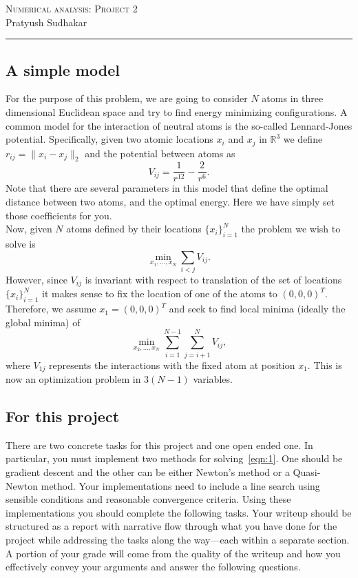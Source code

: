 \documentclass[11pt,onecolumn]{article}
\begin{document}
\noindent
\textsc{\Large Numerical analysis: Project 2}\\
Pratyush Sudhakar
\vspace{0.4cm}
\hrule
\noindent

\subsection*{A simple model}

For the purpose of this problem, we are going to consider $N$ atoms in three dimensional Euclidean space and try to find energy minimizing configurations. A common model for the interaction of neutral atoms is the so-called Lennard-Jones potential. Specifically, given two atomic locations $x_i$ and $x_j$ in $\mathbb{R}^3$ we define $r_{ij} = \|x_i-x_j\|_2$ and the potential between atoms as 
\[
V_{ij} = \frac{1}{r^{12}} - \frac{2}{r^6}.
\]
Note that there are several parameters in this model that define the optimal distance between two atoms, and the optimal energy. Here we have simply set those coefficients for you.
\\
Now, given $N$ atoms defined by their locations $\{x_i\}_{i=1}^N$ the problem we wish to solve is 
\[
\min_{x_1,\ldots,x_N} \sum_{i<j} V_{ij}.
\]
However, since $V_{ij}$ is invariant with respect to translation of the set of locations $\{x_i\}_{i=1}^N$ it makes sense to fix the location of one of the atoms to $(0, 0, 0)^T.$ Therefore, we assume $x_1 = (0, 0, 0)^T$ and seek to find local minima (ideally the global minima) of
\begin{equation}
\min_{x_2,\ldots,x_N} \sum_{i=1}^{N-1}\sum_{j=i+1}^{N} V_{ij},
\label{eqn:1}
\end{equation}
where $V_{1j}$ represents the interactions with the fixed atom at position $x_1.$ This is now an optimization problem in $3(N-1)$ variables.

\subsection*{For this project}
There are two concrete tasks for this project and one open ended one. In particular, you must implement two methods for solving~\eqref{eqn:1}. One should be gradient descent and the other can be either Newton's method or a Quasi-Newton method. Your implementations need to include a line search using sensible conditions and reasonable convergence criteria. Using these implementations you should complete the following tasks. Your writeup should be structured as a report with narrative flow through what you have done for the project while addressing the tasks along the way---each within a separate section. A portion of your grade will come from the quality of the writeup and how you effectively convey your arguments and answer the following questions.
\end{document}
